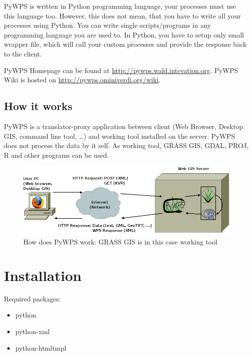 \documentclass[a4paper,11pt]{report}
\begin{document}
PyWPS is written in Python programming language, your processes must use
this language too. However, this does not mean, that you have to write all
your processes using Python. You can write single scripts/programs in any
programming language you are used to. In Python, you have to setup only
small wrapper file, which will call your custom processes and provide the
response back to the client.

PyWPS Homepage can be found at \url{http://pywps.wald.intevation.org}.
PyWPS Wiki is hosted on \url{http://pywps.ominiverdi.org/wiki}.

\section{How it works}
PyWPS is a translator-proxy application between client (Web Browser, Desktop
GIS, command line tool, \dots) and working tool installed on the server.
PyWPS does not process the data by it self. As working tool, GRASS GIS, GDAL, PROJ, R
and other programs can be used.

\begin{figure}[ht]
\begin{center}
\includegraphics[width=1\textwidth]{pic/pywps-schema}
\caption{How does PyWPS work: GRASS GIS is in this case working tool}
\label{pic:pywps}
\end{center}
\end{figure}

\chapter{Installation}
\label{install}   
Required packages:
    
\begin{itemize}
    \item python 
    \item python-xml 
    \item python-htmltmpl 
\end{itemize}
    
\end{document}
